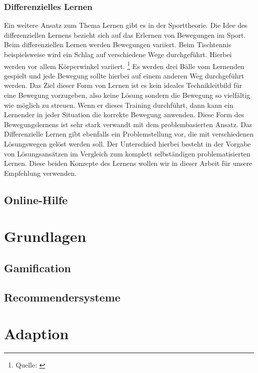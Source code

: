 \subsection{Differenzielles Lernen}
Ein weitere Ansatz zum Thema Lernen gibt es in der Sporttheorie. Die Idee des differenziellen Lernens bezieht sich auf das Erlernen von Bewegungen im Sport. Beim differenziellen Lernen werden Bewegungen variiert. Beim Tischtennis beispielsweise wird ein Schlag auf verschiedene Wege durchgeführt. Hierbei werden vor allem Körperwinkel variiert. \footnote{Quelle: \cite{differenziellesLernen}} Es werden drei Bälle vom Lernenden gespielt und jede Bewegung sollte hierbei auf einem anderen Weg durchgeführt werden. Das Ziel dieser Form von Lernen ist es kein ideales Technikleitbild für eine Bewegung vorzugeben, also keine Lösung sondern die Bewegung so vielfältig wie möglich zu streuen. Wenn er dieses Training durchführt, dann kann ein Lernender in jeder Situation die korrekte Bewegung anwenden. Diese Form des Bewegungslernens ist sehr stark verwandt mit dem problembasierten Ansatz. Das Differenzielle Lernen gibt ebenfalls ein Problemstellung vor, die mit verschiedenen Lösungswegen gelöst werden soll. Der Unterschied hierbei besteht in der Vorgabe von Lösungsansätzen im Vergleich zum komplett selbständigen problematisierten Lernen.  Diese beiden Konzepte des Lernens wollen wir in dieser Arbeit für unsere Empfehlung verwenden.

\section{Online-Hilfe}


\chapter{Grundlagen}
\section{Gamification}

\section{Recommendersysteme}

\chapter{Adaption}
\label{ch:Content1}

